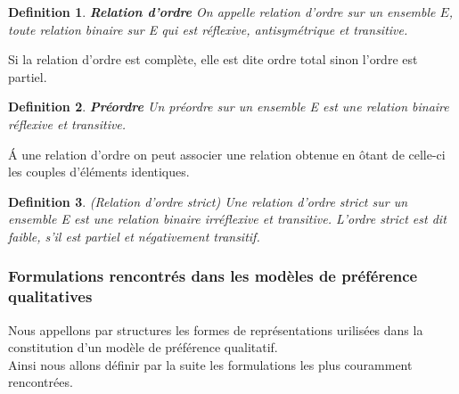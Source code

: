 \documentclass[a4paper,12pt,openany,oneside]{article}
\newtheorem{defn}{Definition} %
\begin{document}
\begin{defn}\textbf{Relation d'ordre}
        On appelle relation d'ordre sur un ensemble $E$, toute relation binaire sur E qui est réflexive, antisymétrique et transitive.
\end{defn}

Si la relation d’ordre est complète, elle est dite ordre total sinon l’ordre est partiel.
\begin{defn}\textbf{Préordre}
Un préordre sur un ensemble E est une relation binaire réflexive et transitive.
\end{defn}

Á une relation d’ordre on peut associer une relation obtenue en ôtant de celle-ci les couples d’éléments identiques.

\begin{defn}(Relation d’ordre strict)
 Une relation d’ordre strict sur un ensemble E est une relation binaire irréflexive et transitive. L’ordre strict est dit faible, s’il est partiel et négativement transitif.
\end{defn}



\subsubsection{Formulations rencontrés dans les modèles de préférence qualitatives}

Nous appellons par structures les formes de représentations urilisées dans la constitution d'un modèle de préférence qualitatif.\\
Ainsi nous allons définir par la suite les formulations les plus couramment rencontrées.
\end{document}
